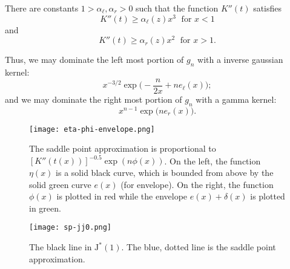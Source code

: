 \documentclass[12pt]{article}
\newcommand{\JJ}{\text{J}^*}
\begin{document}
\begin{lemma}
  There are constants $1> \alpha_\ell, \alpha_r > 0$ such that the function
  $K''(t)$ satisfies
\[
K''(t) \geq  \alpha_\ell(z) x^3 \; \text{ for } x < 1
\]
and
\[
K''(t) \geq  \alpha_r(z) x^2 \; \text{ for } x > 1.
\]
\end{lemma}

Thus, we may dominate the left most portion of $g_n$ with a inverse gaussian kernel:
\[
x^{-3/2} \exp \Big( - \frac{n}{2x} + n e_\ell(x) \Big);
\]
and we may dominate the right most portion of $g_n$ with a gamma kernel:
\[
x^{n-1} \exp \Big( n e_r(x) \Big).
\]

\begin{figure}
\centering
\texttt{[image: eta-phi-envelope.png]}
\caption{\label{fig:envelope} The saddle point approximation is proportional to
  $[K''(t(x))]^{-0.5} \exp( n \phi(x) )$.  On the left, the function $\eta(x)$
  is a solid black curve, which is bounded from above by the solid green curve
  $e(x)$ (for envelope).  On the right, the function $\phi(x)$ is plotted in red
  while the envelope $e(x) + \delta(x)$ is plotted in green.}
\end{figure}

\begin{figure}
\centering
\texttt{[image: sp-jj0.png]}
\caption{\label{fig:saddlepoint} The black line in $\JJ(1)$.  The blue, dotted
  line is the saddle point approximation.}
\end{figure}







{}
\end{document}
